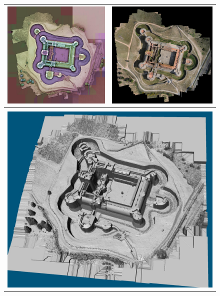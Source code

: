 \begin{figure}
\begin{tabular}{||c|c||}
\hline \hline
\includegraphics[width=80 mm]{FIGS/SAMPLES/Salse2.jpg}&
\includegraphics[width=80 mm]{FIGS/SAMPLES/Ortho-Test-Redr.jpg} \\ \hline  \hline
\\ \multicolumn{2}{|c|}{\includegraphics[width=160 mm]{FIGS/SAMPLES/SlsMNE_1_25.jpg}} \\ \hline  \hline

\end{tabular}
\end{figure}
